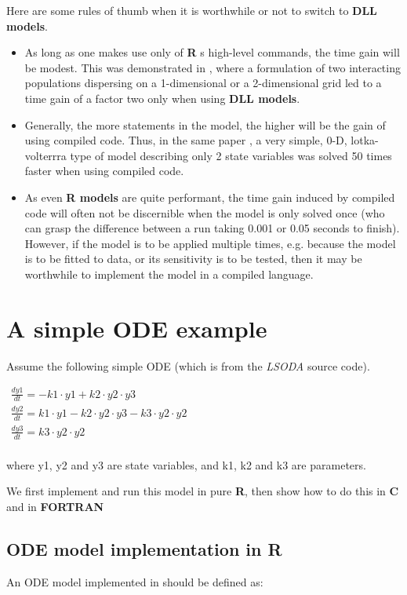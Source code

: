 \documentclass[english]{article}
\newcommand{\R}{\textbf{\textsf{R}}\xspace}
\newcommand{\FOR}{\textbf{\textsf{FORTRAN}}\xspace}
\newcommand{\C}{\textbf{\textsf{C}}\xspace}
\newcommand{\Rmodels}{\textbf{\textsf{R models}}\xspace}
\newcommand{\DLLmodels}{\textbf{\textsf{DLL models}}\xspace}
\begin{document}
Here are some rules of thumb when  it is worthwhile or not to switch to \DLLmodels. 
\begin{itemize}
\item As long as one makes use only of \R s high-level commands, the time gain will be modest. 
This was demonstrated in \citep{Soetaert08}, where a formulation of two interacting populations 
dispersing on a 1-dimensional or a 2-dimensional grid led to a time gain of a factor two only when using \DLLmodels.
\item Generally, the more statements in the model, the higher will be the gain of using compiled code. Thus, in the same paper 
\citep{soetaert08}, a very simple, 0-D, lotka-volterrra type of model describing only 2 state variables was solved 50 times faster when using compiled code.
\item As even \Rmodels are quite performant, the time gain induced by compiled code will often not be discernible when the 
model is only solved once (who can grasp the difference between a run taking 0.001 or 0.05 seconds to finish). 
However, if the model is to be applied multiple times, e.g. because the model is to be fitted to data, or its 
sensitivity is to be tested, then it may be worthwhile to implement the model in a compiled language. 
\end{itemize}

\section{A simple ODE example}

Assume the following simple ODE (which is from the \emph{LSODA} source code).

$\begin{array}{l}
 \frac{{dy1}}{{dt}} =  - k1 \cdot y1 + k2 \cdot y2 \cdot y3 \\ 
 \frac{{dy2}}{{dt}} = k1 \cdot y1 - k2 \cdot y2 \cdot y3 - k3 \cdot y2 \cdot y2 \\ 
 \frac{{dy3}}{{dt}} = k3 \cdot y2 \cdot y2 \\ 
 \end{array}$

 where y1, y2 and y3 are state variables, and k1, k2 and k3 are parameters.
 
We first implement and run this model in pure \R, then show how to do this in \C and in \FOR
\subsection{ODE model implementation in \R}
An ODE model implemented in \bode{pure \R} should be defined as: 
\end{document}
